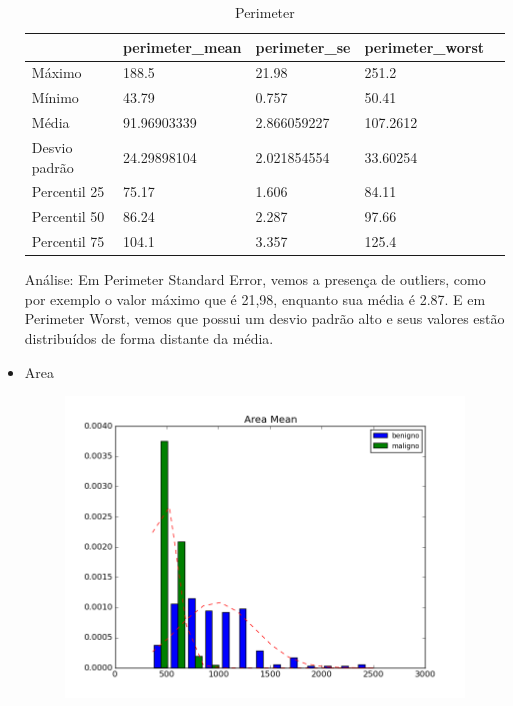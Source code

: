 \documentclass[11pt,a4paper]{article}
\numberwithin{equation}{section}
\begin{document}
\begin{itemize}
\begin{table}[H]
\centering
\caption{Perimeter}
\label{my-label}
\begin{tabular}{lllll} \hline
              & perimeter\_mean & perimeter\_se & perimeter\_worst &  \\ \hline
Máximo        & 188.5           & 21.98         & 251.2            &  \\
Mínimo        & 43.79           & 0.757         & 50.41            &  \\
Média         & 91.96903339     & 2.866059227   & 107.2612         &  \\
Desvio padrão & 24.29898104     & 2.021854554   & 33.60254         &  \\
Percentil 25  & 75.17           & 1.606         & 84.11            &  \\
Percentil 50  & 86.24           & 2.287         & 97.66            &  \\
Percentil 75  & 104.1           & 3.357         & 125.4            & \\ \hline
\end{tabular}
\end{table}

Análise: Em Perimeter Standard Error, vemos a presença de outliers, como por exemplo o valor máximo que é 21,98,  enquanto sua média é 2.87. E em Perimeter Worst, vemos que possui um desvio padrão alto e seus valores estão distribuídos de forma distante da média.


\item Area
\begin{figure}[H]
\centering
  \includegraphics[width=.5\linewidth]{../img/hist/area_mean}
  \label{fig:test1}
\end{figure}%


\end{itemize}
\end{document}
